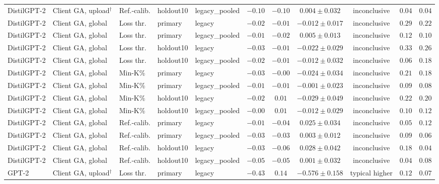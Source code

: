 {\begin{longtable}{@{\extracolsep{\fill}}lllllcccccc@{}}
DistilGPT-2 & Client GA, upload$^{\dagger}$ & Ref.-calib. & holdout10 & legacy\_pooled & $-0.10$ & $-0.10$ & $0.004 \pm 0.032$ & inconclusive & $0.04$ & $0.04$ \\
DistilGPT-2 & Client GA, global & Loss thr. & primary & legacy & $-0.02$ & $-0.01$ & $-0.012 \pm 0.017$ & inconclusive & $0.29$ & $0.22$ \\
DistilGPT-2 & Client GA, global & Loss thr. & primary & legacy\_pooled & $-0.01$ & $-0.02$ & $0.005 \pm 0.013$ & inconclusive & $0.12$ & $0.10$ \\
DistilGPT-2 & Client GA, global & Loss thr. & holdout10 & legacy & $-0.03$ & $-0.01$ & $-0.022 \pm 0.029$ & inconclusive & $0.33$ & $0.26$ \\
DistilGPT-2 & Client GA, global & Loss thr. & holdout10 & legacy\_pooled & $-0.02$ & $-0.01$ & $-0.012 \pm 0.032$ & inconclusive & $0.06$ & $0.18$ \\
DistilGPT-2 & Client GA, global & Min-K\% & primary & legacy & $-0.03$ & $-0.00$ & $-0.024 \pm 0.034$ & inconclusive & $0.21$ & $0.18$ \\
DistilGPT-2 & Client GA, global & Min-K\% & primary & legacy\_pooled & $-0.01$ & $-0.01$ & $-0.001 \pm 0.023$ & inconclusive & $0.09$ & $0.08$ \\
DistilGPT-2 & Client GA, global & Min-K\% & holdout10 & legacy & $-0.02$ & $0.01$ & $-0.029 \pm 0.049$ & inconclusive & $0.22$ & $0.20$ \\
DistilGPT-2 & Client GA, global & Min-K\% & holdout10 & legacy\_pooled & $-0.00$ & $0.01$ & $-0.012 \pm 0.029$ & inconclusive & $0.10$ & $0.12$ \\
DistilGPT-2 & Client GA, global & Ref.-calib. & primary & legacy & $-0.01$ & $-0.04$ & $0.025 \pm 0.034$ & inconclusive & $0.05$ & $0.12$ \\
DistilGPT-2 & Client GA, global & Ref.-calib. & primary & legacy\_pooled & $-0.03$ & $-0.03$ & $0.003 \pm 0.012$ & inconclusive & $0.09$ & $0.06$ \\
DistilGPT-2 & Client GA, global & Ref.-calib. & holdout10 & legacy & $-0.03$ & $-0.06$ & $0.028 \pm 0.042$ & inconclusive & $0.18$ & $0.04$ \\
DistilGPT-2 & Client GA, global & Ref.-calib. & holdout10 & legacy\_pooled & $-0.05$ & $-0.05$ & $0.001 \pm 0.032$ & inconclusive & $0.04$ & $0.08$ \\
GPT-2 & Client GA, upload$^{\dagger}$ & Loss thr. & primary & legacy & $-0.43$ & $0.14$ & $-0.576 \pm 0.158$ & typical higher & $0.12$ & $0.07$ \\

\end{longtable}}
